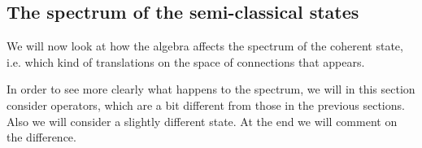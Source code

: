 \documentclass[12pt]{article}
\begin{document}














\subsection{The spectrum of the semi-classical states}
\label{ISIL}

We will now look at how the algebra affects the spectrum of the coherent state, i.e. which kind of translations on the space of connections that appears. 




 In order to see more clearly what happens to the spectrum, we will in this section consider operators, which are a bit different from those in the previous sections. Also we will consider a slightly different state. At the end we will comment on the difference.
 
\end{document}
